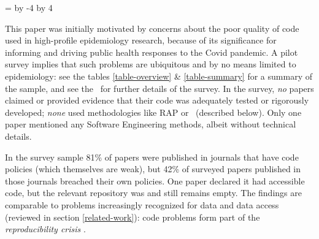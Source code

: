 \documentclass{comjnl}
\begin{document}
\begin{table*}
\newdimen\quarterwidth
\newdimen\separation
\separation=3mm
\quarterwidth=\textwidth
\advance\quarterwidth by -4\separation
\divide\quarterwidth by 4
\caption{The TOP committee's recommended levels for journal article code transparency. Level 0 is provided for a comparison that does not meet any TOP requirements. Concerns about the interpretation of ``reproduced independently,'' as required at level 4, are raised in section \ref{reproducibility-concerns}.}
\label{TOPtable}
\end{table*}

This paper was initially motivated by concerns about the poor quality of code used in high-profile epidemiology research, because of its significance for informing and driving public health responses to the Covid pandemic. A pilot survey implies that such problems are ubiquitous and by no means limited to epidemiology: see the tables \ref{table-overview} \& \ref{table-summary} for a summary of the sample, and see the \supplement\ for further details of the survey. In the survey, \emph{no\/} papers claimed or provided evidence that their code was adequately tested or rigorously developed; \emph{none\/} used methodologies like RAP or \RAPstar\ (described below). Only one paper mentioned any Software Engineering methods, albeit without technical details. 

In the survey sample 81\% of papers were published in journals that have code policies (which themselves are weak), but 42\% of surveyed papers published in those journals breached their own policies. One paper declared it had accessible code, but the relevant repository was and still remains empty. The findings are comparable to problems increasingly recognized for data and data access (reviewed in section \ref{related-work}): code problems form part of the \emph{reproducibility crisis\/} .
\end{document}
